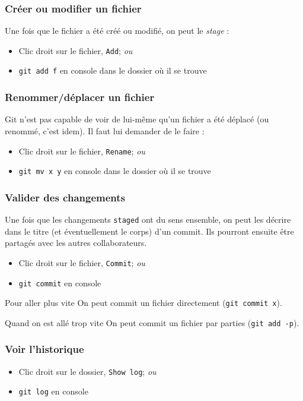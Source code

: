 \documentclass[compress]{beamer}
\begin{document}
\begin{frame}
	\frametitle{Créer ou modifier un fichier}
	Une fois que le fichier a été créé ou modifié, on peut le \emph{stage} :
	\begin{itemize}
		\item Clic droit sur le fichier, \texttt{Add}; \textit{ou} %
		\item \texttt{git add f} en console dans le dossier où il se trouve
	\end{itemize}
\end{frame}

\begin{frame}
	\frametitle{Renommer/déplacer un fichier}
	Git n'est pas capable de voir de lui-même qu'un fichier a été déplacé (ou
	renommé, c'est idem). Il faut lui demander de le faire :
	\begin{itemize}
		\item Clic droit sur le fichier, \texttt{Rename}; \textit{ou} %
		\item \texttt{git mv x y} en console dans le dossier où il se trouve
	\end{itemize}
\end{frame}

\begin{frame}
	\frametitle{Valider des changements}
	Une fois que les changements \texttt{staged} ont du sens ensemble,
	on peut les décrire dans le titre (et éventuellement le corps) d'un commit.
	Ils pourront ensuite être partagés avec les autres collaborateurs.
	\begin{itemize}
		\item Clic droit sur le fichier, \texttt{Commit}; \textit{ou} %
		\item \texttt{git commit} en console
	\end{itemize}

	\begin{block}{Pour aller plus vite}
		On peut commit un fichier directement (\texttt{git commit x}).
	\end{block}

	\begin{block}{Quand on est allé trop vite}
		On peut commit un fichier par parties (\texttt{git add -p}).
	\end{block}
\end{frame}

\begin{frame}
	\frametitle{Voir l'historique}
	\begin{itemize}
		\item Clic droit sur le dossier, \texttt{Show log}; \textit{ou} %
		\item \texttt{git log} en console
	\end{itemize}
\end{frame}
\end{document}
